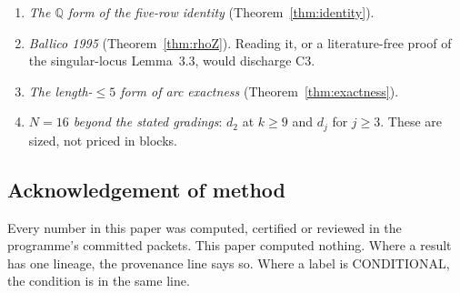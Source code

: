 \documentclass[11pt]{amsart}
\theoremstyle{plain}
\theoremstyle{definition}
\theoremstyle{remark}
\newcommand{\bQ}{\mathbb{Q}}
\begin{document}
\begin{enumerate}
record's own reduction from $N=9$ to $N=7$, at $\ell(\lambda)=7$, is PROVED (B25-05's Lemma~R,
reviewed in B25-10 \S2). It carries the \emph{sign} of the programme's only
positive result (GAPS~G-37, closed).
\item \emph{The $\bQ$ form of the five-row identity} (Theorem~\ref{thm:identity}).
\item \emph{Ballico 1995} (Theorem~\ref{thm:rhoZ}). Reading it, or a literature-free proof of
the singular-locus Lemma~3.3, would discharge C3.
\item \emph{The length-$\le5$ form of arc exactness} (Theorem~\ref{thm:exactness}).
\item \emph{$N=16$ beyond the stated gradings}: $d_2$ at $k\ge9$ and $d_j$ for $j\ge3$. These are
sized, not priced in blocks.
\end{enumerate}

\subsection*{Acknowledgement of method}
Every number in this paper was computed, certified or reviewed in the programme's committed
packets. This paper computed nothing. Where a result has one lineage, the provenance line says
so. Where a label is CONDITIONAL, the condition is in the same line.
\end{document}
